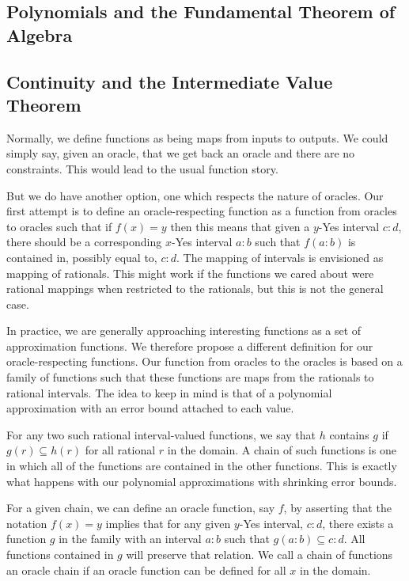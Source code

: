 \documentclass[12pt]{article}
\theoremstyle{remark}
\begin{document}
\subsection{Polynomials and the Fundamental Theorem of Algebra}

\subsection{Continuity and the Intermediate Value Theorem}

Normally, we define functions as being maps from inputs to outputs. We could simply say, given an oracle, that we get back an oracle and there are no constraints. This would lead to the usual function story. 

But we do have another option, one which respects the nature of oracles. Our first attempt is to define an oracle-respecting function as a function from oracles to oracles such that if $f(x) = y$ then this means that given a $y$-Yes interval $c:d$, there should be a corresponding $x$-Yes interval $a:b$ such that $f(a:b)$ is contained in, possibly equal to, $c:d$. The mapping of intervals is envisioned as mapping of rationals. This might work if the functions we cared about were rational mappings when restricted to the rationals, but this is not the general case. 

In practice, we are generally approaching interesting functions as a set of approximation functions. We therefore propose a different definition for our oracle-respecting functions. Our function from oracles to the oracles is based on a family of functions such that these functions are maps from the rationals to rational intervals. The idea to keep in mind is that of a polynomial approximation with an error bound attached to each value. 

For any two such rational interval-valued functions, we say that $h$ contains $g$ if $g(r) \subseteq h(r)$ for all rational $r$ in the domain. A chain of such functions is one in which all of the functions are contained in the other functions. This is exactly what happens with our polynomial approximations with shrinking error bounds.

For a given chain, we can define an oracle function, say $f$, by asserting that the notation $f(x) = y$ implies that for any given $y$-Yes interval, $c:d$, there exists a function $g$ in the family with an interval $a:b$ such that $g(a:b) \subseteq c:d$. All functions contained in $g$ will preserve that relation. We call a chain of functions an oracle chain if an oracle function can be defined for all $x$ in the domain.
\end{document}
